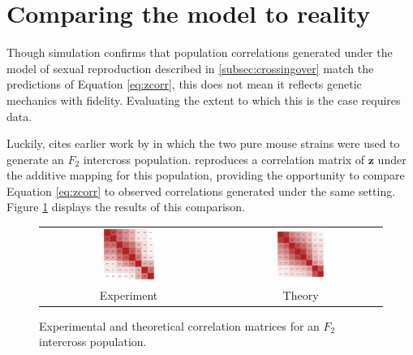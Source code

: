 \documentclass{article}
\newcommand{\code}[1]{\texttt{#1}}
\newcommand{\ve}[1]{\mathbf{#1}}           %
\begin{document}

\section{Comparing the model to reality} \label{sec:model2real}

Though simulation confirms that population correlations generated under the model of sexual reproduction described in \ref{subsec:crossingover} match the predictions of Equation \ref{eq:zcorr}, this does not mean it reflects genetic mechanics with fidelity. Evaluating the extent to which this is the case requires data.

Luckily, \cite{cheverud2001} cites earlier work by \cite{cheverudetal2001} in which the two pure mouse strains were used to generate an $F_2$ intercross population. \cite{cheverud2001} reproduces a correlation matrix of $\ve{z}$ under the additive mapping for this population, providing the opportunity to compare Equation \ref{eq:zcorr} to observed correlations generated under the same setting. Figure \ref{fig:corr2real} displays the results of this comparison.

\begin{figure}[htp]
  \begin{center}
    \begin{tabular}{cc}
      \includegraphics[width = 0.300\textwidth]{./img/chevCorr.png} &
      \includegraphics[width = 0.300\textwidth]{./img/chevCorrTheory.png} \\
      {\footnotesize Experiment} &
      {\footnotesize Theory}
    \end{tabular}
  \end{center}
  \caption{Experimental and theoretical correlation matrices for an $F_2$ intercross population.}
  \label{fig:corr2real}
\end{figure}
\end{document}
